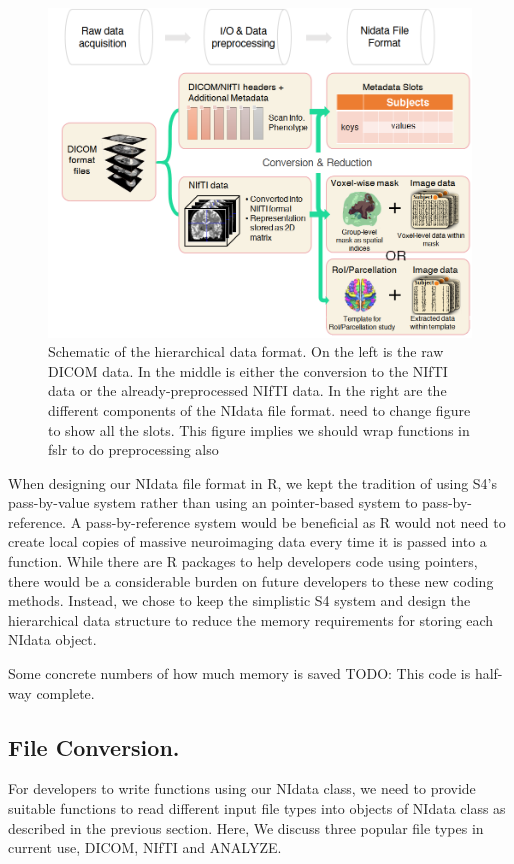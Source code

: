 \documentclass{nature}
\begin{document}
\begin{figure}[tb]
\centering
\includegraphics[width=400pt]{fig/brainconductor/file_format.png}
\caption{Schematic of the hierarchical data format. On the left is the raw DICOM
data. In the middle is either the conversion to the NIfTI data or the already-preprocessed
NIfTI data. In the right are the different components of the NIdata file format. {\color{red}need to change figure to show all the slots. This figure implies
we should wrap functions in fslr to do preprocessing also}}
\label{fig:fileformat}
\end{figure}


When designing our NIdata file format in R, we kept the tradition of using S4's
pass-by-value system rather than using an pointer-based system to pass-by-reference.
A pass-by-reference system would be beneficial as R would not need to 
create local copies of massive neuroimaging data every time it is passed into a
function. While there are R packages to help developers
code using pointers\cite{bengtsson2003r}, there would be a 
considerable burden on future developers to these new coding methods.
Instead, we chose to keep the simplistic S4 system and design the hierarchical
data structure to reduce the memory requirements for storing each NIdata object.

{\color{red}Some concrete numbers of how much memory is saved}
{\color{red}TODO: This code is half-way complete.}

\subsection{File Conversion.}
For developers to write functions using our NIdata class, we need to provide
suitable functions to read different input file types into objects of NIdata
class as described in the previous section. Here, We discuss three popular file
types in current use, DICOM, NIfTI and ANALYZE.
\end{document}

